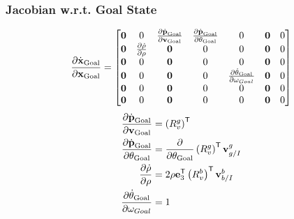 \subsubsection{Jacobian w.r.t. Goal State}
\begin{equation}
  \frac{\partial \dot{\boldsymbol{\mathrm{x}}}_{\text{Goal}}}{\partial \boldsymbol{\mathrm{x}}_{\text{Goal}}}
  =
  \begin{bmatrix}
    \boldsymbol{\mathrm{0}} & 0 & \frac{\partial \dot{\boldsymbol{\mathrm{p}}}_{\text{Goal}}}{\partial
      \boldsymbol{\mathrm{v}}_{\text{Goal}}} & \frac{\partial
      \dot{\boldsymbol{\mathrm{p}}}_{\text{Goal}}}{\partial \theta_{\text{Goal}}} & 0 & \boldsymbol{\mathrm{0}} & 0 \\
    \boldsymbol{\mathrm{0}} & \frac{\partial \dot{\rho}}{\partial \rho} & \boldsymbol{\mathrm{0}} & 0 & 0
             & \boldsymbol{\mathrm{0}} & 0 \\
    \boldsymbol{\mathrm{0}} & 0 & \boldsymbol{\mathrm{0}} & 0 & 0 & \boldsymbol{\mathrm{0}} & 0 \\
    \boldsymbol{\mathrm{0}} & 0 & \boldsymbol{\mathrm{0}} & 0 & \frac{\partial
      \dot{\theta}_{\text{Goal}}}{\partial \omega_{Goal}} & \boldsymbol{\mathrm{0}} & 0 \\
    \boldsymbol{\mathrm{0}} & 0 & \boldsymbol{\mathrm{0}} & 0 & 0 & \boldsymbol{\mathrm{0}} & 0 \\
    \boldsymbol{\mathrm{0}} & 0 & \boldsymbol{\mathrm{0}} & 0 & 0 & \boldsymbol{\mathrm{0}} & 0
  \end{bmatrix}
\end{equation}
\begin{align}
    \frac{\partial \dot{\boldsymbol{\mathrm{p}}}_{\text{Goal}}}{\partial
      \boldsymbol{\mathrm{v}}_{\text{Goal}}}
      &=
      \left(R_{v}^{g}\right)^{\mathsf{T}}
      \\
    \frac{\partial \dot{\boldsymbol{\mathrm{p}}}_{\text{Goal}}}{\partial \theta_{\text{Goal}}}
      &=
      \frac{\partial}{\partial \theta_{\text{Goal}}} \left(R_{v}^{g}\right)^{\mathsf{T}} \boldsymbol{\mathrm{v}}_{g/I}^{g}
      \\
    \frac{\partial \dot{\rho}}{\partial \rho}
      &=
      2 \rho \boldsymbol{\mathrm{e}}_{3}^{\mathsf{T}} \left(R_{v}^{b}\right)^{\mathsf{T}} \boldsymbol{\mathrm{v}}_{b/I}^{b}
      \\
    \frac{\partial \dot{\theta}_{\text{Goal}}}{\partial \omega_{Goal}}
      &=
      1
\end{align}

